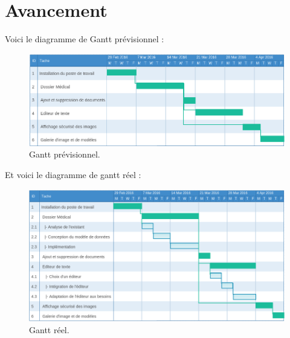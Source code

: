 \newpage
\section*{Avancement} %

Voici le diagramme de Gantt prévisionnel : 

\begin{figure}[H]
  \centering
  \includegraphics[width=17cm]{./img/gantt_prev}
  \caption{\label{fig:mb_va_ast} Gantt prévisionnel.}
\end{figure}

Et voici le diagramme de gantt réel : 

\begin{figure}[H]
  \centering
  \includegraphics[width=17cm]{./img/gantt_reel}
  \caption{\label{fig:mb_va_ast} Gantt réel.}
\end{figure}






